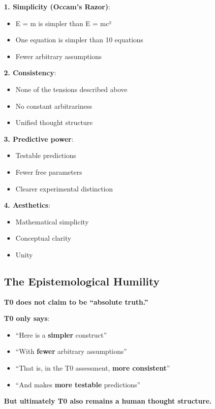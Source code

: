	\textbf{1. Simplicity (Occam's Razor)}:
	\begin{itemize}
		\item E = m is simpler than E = mc²
		\item One equation is simpler than 10 equations
		\item Fewer arbitrary assumptions
	\end{itemize}
	
	\textbf{2. Consistency}:
	\begin{itemize}
		\item None of the tensions described above
		\item No constant arbitrariness
		\item Unified thought structure
	\end{itemize}
	
	\textbf{3. Predictive power}:
	\begin{itemize}
		\item Testable predictions
		\item Fewer free parameters
		\item Clearer experimental distinction
	\end{itemize}
	
	\textbf{4. Aesthetics}:
	\begin{itemize}
		\item Mathematical simplicity
		\item Conceptual clarity
		\item Unity
	\end{itemize}
	
	\subsection{The Epistemological Humility}
	
	\textbf{T0 does not claim to be ``absolute truth.''}
	
	\textbf{T0 only says}:
	\begin{itemize}
		\item ``Here is a \textbf{simpler} construct''
		\item ``With \textbf{fewer} arbitrary assumptions''
		\item ``That is, in the T0 assessment, \textbf{more consistent}''
		\item ``And makes \textbf{more testable} predictions''
	\end{itemize}
	
	\textbf{But ultimately T0 also remains a human thought structure.}
	
